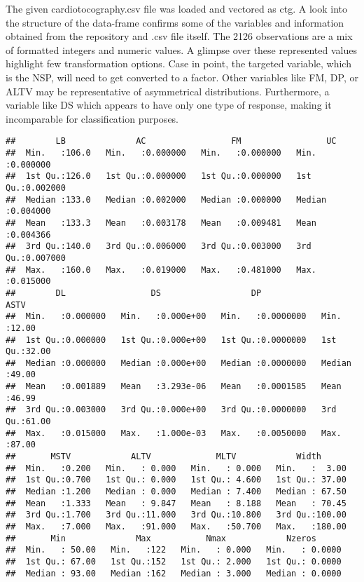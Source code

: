 \documentclass[
]{article}
\begin{document}
The given cardiotocography.csv file was loaded and vectored as ctg. A
look into the structure of the data-frame confirms some of the variables
and information obtained from the repository and .csv file itself. The
2126 observations are a mix of formatted integers and numeric values. A
glimpse over these represented values highlight few transformation
options. Case in point, the targeted variable, which is the NSP, will
need to get converted to a factor. Other variables like FM, DP, or ALTV
may be representative of asymmetrical distributions. Furthermore, a
variable like DS which appears to have only one type of response, making
it incomparable for classification purposes.

\begin{verbatim}
##        LB              AC                 FM                 UC          
##  Min.   :106.0   Min.   :0.000000   Min.   :0.000000   Min.   :0.000000  
##  1st Qu.:126.0   1st Qu.:0.000000   1st Qu.:0.000000   1st Qu.:0.002000  
##  Median :133.0   Median :0.002000   Median :0.000000   Median :0.004000  
##  Mean   :133.3   Mean   :0.003178   Mean   :0.009481   Mean   :0.004366  
##  3rd Qu.:140.0   3rd Qu.:0.006000   3rd Qu.:0.003000   3rd Qu.:0.007000  
##  Max.   :160.0   Max.   :0.019000   Max.   :0.481000   Max.   :0.015000  
##        DL                 DS                  DP                 ASTV      
##  Min.   :0.000000   Min.   :0.000e+00   Min.   :0.0000000   Min.   :12.00  
##  1st Qu.:0.000000   1st Qu.:0.000e+00   1st Qu.:0.0000000   1st Qu.:32.00  
##  Median :0.000000   Median :0.000e+00   Median :0.0000000   Median :49.00  
##  Mean   :0.001889   Mean   :3.293e-06   Mean   :0.0001585   Mean   :46.99  
##  3rd Qu.:0.003000   3rd Qu.:0.000e+00   3rd Qu.:0.0000000   3rd Qu.:61.00  
##  Max.   :0.015000   Max.   :1.000e-03   Max.   :0.0050000   Max.   :87.00  
##       MSTV            ALTV             MLTV            Width       
##  Min.   :0.200   Min.   : 0.000   Min.   : 0.000   Min.   :  3.00  
##  1st Qu.:0.700   1st Qu.: 0.000   1st Qu.: 4.600   1st Qu.: 37.00  
##  Median :1.200   Median : 0.000   Median : 7.400   Median : 67.50  
##  Mean   :1.333   Mean   : 9.847   Mean   : 8.188   Mean   : 70.45  
##  3rd Qu.:1.700   3rd Qu.:11.000   3rd Qu.:10.800   3rd Qu.:100.00  
##  Max.   :7.000   Max.   :91.000   Max.   :50.700   Max.   :180.00  
##       Min              Max           Nmax            Nzeros       
##  Min.   : 50.00   Min.   :122   Min.   : 0.000   Min.   : 0.0000  
##  1st Qu.: 67.00   1st Qu.:152   1st Qu.: 2.000   1st Qu.: 0.0000  
##  Median : 93.00   Median :162   Median : 3.000   Median : 0.0000  

\end{verbatim}
\end{document}
